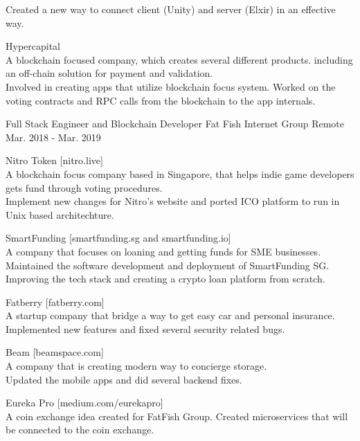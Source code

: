 \begin{cventries}
{\begin{cvitems}
{                    Created a new way to connect client (Unity) and server (Elxir) in an effective way.}
                \item
                    {Hypercapital\\
                    A blockchain focused company, which creates several different products. including an off-chain solution for payment and validation.\\
                    Involved in creating apps that utilize blockchain focus system. Worked on the voting contracts and RPC calls from the blockchain to the app internals.}
            \end{cvitems}        
        }
        
    \cventry
        {Full Stack Engineer and Blockchain Developer}
        {Fat Fish Internet Group}
        {Remote}
        {Mar. 2018 - Mar. 2019}
        {
            \begin{cvitems}
                \item
                    {Nitro Token [nitro.live]\\
                    A blockchain focus company based in Singapore, that helps indie game developers gets fund through voting procedures.\\
                    Implement new changes for Nitro's website and ported ICO platform to run in Unix based architechture.}
                \item
                    {SmartFunding [smartfunding.sg and smartfunding.io]\\
                    A company that focuses on loaning and getting funds for SME businesses.\\
                    Maintained the software development and deployment of SmartFunding SG. Improving the tech stack and creating a crypto loan platform from scratch.}
                \item
                    {Fatberry [fatberry.com]\\
                    A startup company that bridge a way to get easy car and personal insurance.\\
                    Implemented new features and fixed several security related bugs.}
                \item
                    {Beam [beamspace.com]\\
                    A company that is creating modern way to concierge storage.\\
                    Updated the mobile apps and did several backend fixes.}
                \item
                    {Eureka Pro [medium.com/eurekapro]\\
                    A coin exchange idea created for FatFish Group.
                    Created microservices that will be connected to the coin exchange.}
            \end{cvitems}
        }


\end{cventries}
